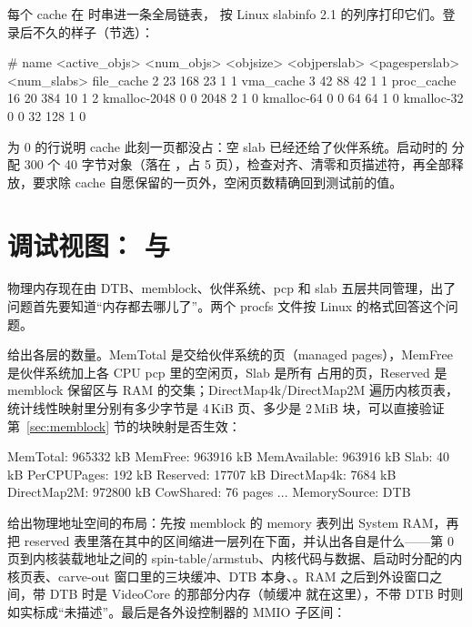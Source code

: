 每个 cache 在  时串进一条全局链表， 按 Linux slabinfo 2.1 的列序打印它们。登录后不久的样子（节选）：

\begin{txtcode}
# name            <active_objs> <num_objs> <objsize> <objperslab> <pagesperslab> <num_slabs>
file_cache                    2         23       168           23              1           1
vma_cache                     3         42        88           42              1           1
proc_cache                   16         20       384           10              1           2
kmalloc-2048                  0          0      2048            2              1           0
kmalloc-64                    0          0        64           64              1           0
kmalloc-32                    0          0        32          128              1           0
\end{txtcode}

 为 0 的行说明 cache 此刻一页都没占：空 slab 已经还给了伙伴系统。启动时的  分配 300 个 40 字节对象（落在 ，占 5 页），检查对齐、清零和页描述符，再全部释放，要求除 cache 自愿保留的一页外，空闲页数精确回到测试前的值。

\section{调试视图： 与 }
\label{sec:proc-mem}

物理内存现在由 DTB、memblock、伙伴系统、pcp 和 slab 五层共同管理，出了问题首先要知道“内存都去哪儿了”。两个 procfs 文件按 Linux 的格式回答这个问题。

 给出各层的数量。MemTotal 是交给伙伴系统的页（managed pages），MemFree 是伙伴系统加上各 CPU pcp 里的空闲页，Slab 是所有  占用的页，Reserved 是 memblock 保留区与 RAM 的交集；DirectMap4k/DirectMap2M 遍历内核页表，统计线性映射里分别有多少字节是 4\,KiB 页、多少是 2\,MiB 块，可以直接验证第~\ref{sec:memblock} 节的块映射是否生效：

\begin{txtcode}
MemTotal:       965332 kB
MemFree:        963916 kB
MemAvailable:   963916 kB
Slab:           40 kB
PerCPUPages:    192 kB
Reserved:       17707 kB
DirectMap4k:    7684 kB
DirectMap2M:    972800 kB
CowShared:      76 pages
...
MemorySource:   DTB
\end{txtcode}

 给出物理地址空间的布局：先按 memblock 的 memory 表列出 System RAM，再把 reserved 表里落在其中的区间缩进一层列在下面，并认出各自是什么——第 0 页到内核装载地址之间的 spin-table/armstub、内核代码与数据、启动时分配的内核页表、carve-out 窗口里的三块缓冲、DTB 本身、。RAM 之后到外设窗口之间，带 DTB 时是 VideoCore 的那部分内存（帧缓冲  就在这里），不带 DTB 时则如实标成“未描述”。最后是各外设控制器的 MMIO 子区间：

